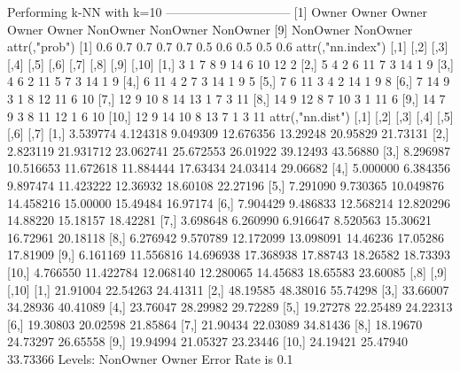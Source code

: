\documentclass{article}
\begin{document}
\begin{Schunk}
\begin{Soutput}
Performing k-NN with k=10
 ------------------------------
 [1] Owner    Owner    Owner    Owner    Owner    NonOwner NonOwner NonOwner
 [9] NonOwner NonOwner
attr(,"prob")
 [1] 0.6 0.7 0.7 0.7 0.7 0.5 0.6 0.5 0.5 0.6
attr(,"nn.index")
      [,1] [,2] [,3] [,4] [,5] [,6] [,7] [,8] [,9] [,10]
 [1,]    3    1    7    8    9   14    6   10   12     2
 [2,]    5    4    2    6   11    7    3   14    1     9
 [3,]    4    6    2   11    5    7    3   14    1     9
 [4,]    6   11    4    2    7    3   14    1    9     5
 [5,]    7    6   11    3    4    2   14    1    9     8
 [6,]    7   14    9    3    1    8   12   11    6    10
 [7,]   12    9   10    8   14   13    1    7    3    11
 [8,]   14    9   12    8    7   10    3    1   11     6
 [9,]   14    7    9    3    8   11   12    1    6    10
[10,]   12    9   14   10    8   13    7    1    3    11
attr(,"nn.dist")
          [,1]      [,2]      [,3]      [,4]     [,5]     [,6]     [,7]
 [1,] 3.539774  4.124318  9.049309 12.676356 13.29248 20.95829 21.73131
 [2,] 2.823119 21.931712 23.062741 25.672553 26.01922 39.12493 43.56880
 [3,] 8.296987 10.516653 11.672618 11.884444 17.63434 24.03414 29.06682
 [4,] 5.000000  6.384356  9.897474 11.423222 12.36932 18.60108 22.27196
 [5,] 7.291090  9.730365 10.049876 14.458216 15.00000 15.49484 16.97174
 [6,] 7.904429  9.486833 12.568214 12.820296 14.88220 15.18157 18.42281
 [7,] 3.698648  6.260990  6.916647  8.520563 15.30621 16.72961 20.18118
 [8,] 6.276942  9.570789 12.172099 13.098091 14.46236 17.05286 17.81909
 [9,] 6.161169 11.556816 14.696938 17.368938 17.88743 18.26582 18.73393
[10,] 4.766550 11.422784 12.068140 12.280065 14.45683 18.65583 23.60085
          [,8]     [,9]    [,10]
 [1,] 21.91004 22.54263 24.41311
 [2,] 48.19585 48.38016 55.74298
 [3,] 33.66007 34.28936 40.41089
 [4,] 23.76047 28.29982 29.72289
 [5,] 19.27278 22.25489 24.22313
 [6,] 19.30803 20.02598 21.85864
 [7,] 21.90434 22.03089 34.81436
 [8,] 18.19670 24.73297 26.65558
 [9,] 19.94994 21.05327 23.23446
[10,] 24.19421 25.47940 33.73366
Levels: NonOwner Owner
Error Rate is  0.1


\end{Soutput}
\end{Schunk}
\end{document}
